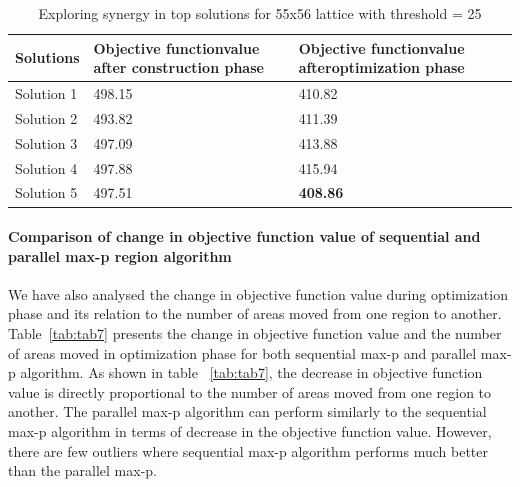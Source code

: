 \documentclass[conference]{IEEEtran}
\begin{document}
\begin{table}[!htbp]
\begin{center}
\begin{tabular}{|C{1.4cm}|C{1.4cm}|C{1.4cm}|}
\hline
Solutions & Objective function\newline value after \newline construction phase & Objective function\newline value after\newline optimization phase\\
\hline
Solution 1 & 498.15 & 410.82\\
\hline
Solution 2 & 493.82 & 411.39\\
\hline
Solution 3 & 497.09 & 413.88\\
\hline
Solution 4 & 497.88 & 415.94\\
\hline
Solution 5 & 497.51 & \textbf{408.86}\\
\hline
\end{tabular}
\caption{Exploring synergy in top solutions for 55x56 lattice with threshold = 25}
\label{tab:tab10}
\end{center}
\end{table}

\paragraph{Comparison of change in objective function value of sequential and parallel max-p region algorithm}
We have also analysed the change in objective function value during optimization
phase and its relation to the number of areas moved from one region to another.
Table~\ref{tab:tab7} presents the change in objective function value and the number
of areas moved in optimization phase for both sequential max-p and parallel
max-p algorithm. As shown in table ~\ref{tab:tab7}, the decrease in objective
function value is directly proportional to the number of areas moved from one
region to another. The parallel max-p algorithm can perform similarly to
the sequential max-p algorithm in terms of decrease in the objective function
value. However, there are few outliers where sequential max-p algorithm performs
much better than the parallel max-p.
\end{document}
